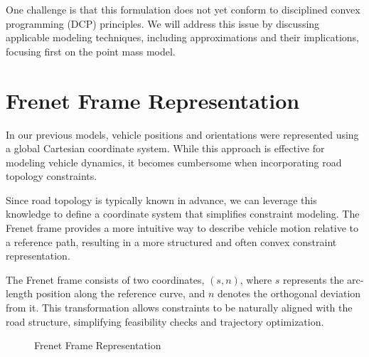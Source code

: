 One challenge is that this formulation does not yet conform to disciplined convex programming (DCP) principles.
We will address this issue by discussing applicable modeling techniques, including approximations and their implications, focusing first on the point
mass model.

\section{Frenet Frame Representation}

In our previous models, vehicle positions and orientations were represented using a global Cartesian coordinate system.
While this approach is effective for modeling vehicle dynamics, it becomes cumbersome when incorporating road topology constraints.

Since road topology is typically known in advance, we can leverage this knowledge to define a coordinate system that simplifies constraint modeling.
The Frenet frame provides a more intuitive way to describe vehicle motion relative to a reference path, resulting in a more structured and often
convex constraint representation.

The Frenet frame consists of two coordinates, $(s, n)$, where $s$ represents the arc-length position along the reference curve, and $n$ denotes the
orthogonal deviation from it.
This transformation allows constraints to be naturally aligned with the road structure, simplifying feasibility checks and trajectory optimization.

\begin{figure}[h]
	\centering
	\caption{Frenet Frame Representation}
	\label{fig:frenet_frame}
\end{figure}

